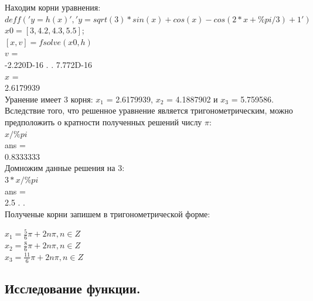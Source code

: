 \documentclass[russian, utf8, nocolumnxxxi, nocolumnxxxii, 14pt]{eskdtext}
\begin{document}
\indent Находим корни уравнения: \\
$deff('y=h(x)','y=sqrt(3)*sin(x)+cos(x)-cos(2*x+\%pi/3)+1')$ \\
$x0=[3,4.2,4.3,5.5]$; \\
$[x,v]=fsolve(x0,h)$ \\
 $v$  = \\
-2.220D-16 . . \quad 7.772D-16 \\
 $x$  = \\
   2.6179939    \\
\indent Уранение имеет 3 корня: $x_1$ = 2.6179939, $x_2$ = 4.1887902 и $x_3$ = 5.759586. 
\indent Вследствие того, что решенное уравнение является тригонометрическим, можно предположить о кратности полученных решений числу $\pi$:\\
$x/\%pi$\\
 ans  =\\
   0.8333333   \\
\indent Домножим данные решения на 3:\\
$3*x/\%pi$ \\
 ans  = \\
   2.5 . . \\
\indent Полученые корни запишем в тригонометрической форме:\\
\begin{center}
$x_1 = \frac{5}{6}\pi + 2n\pi, n \in Z$\\
$x_2 = \frac{8}{6}\pi + 2n\pi, n \in Z$\\
$x_3 = \frac{11}{6}\pi + 2n\pi, n \in Z$\\
\end{center}
\subsection{Исследование функции.}
\end{document}
